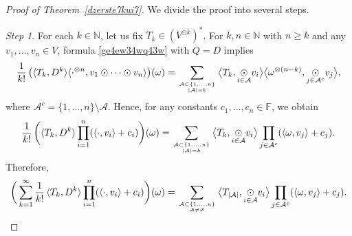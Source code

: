 \documentclass[12pt]{article}
\theoremstyle{remark}
\theoremstyle{remark}
\theoremstyle{remark}
\begin{document}
\begin{proof}[Proof of Theorem~\ref{dzerste7kui7}] We divide the proof into several 
steps.

{\it Step 1}. For each $k\in\mathbb N$, let us fix  $T_k\in(V^{\odot k})^*$. For $k,n\in\mathbb N$ with $n\ge k$ and any $v_1,\dots,v_n\in V$, formula \eqref{ge4ew34wq43w} with $Q=D$ implies
$$ \frac1{k!}\,\big(\langle T_k ,D^{k}\rangle\langle\cdot ^{\otimes n},v_1\odot\dots\odot v_n\rangle\big)(\omega)=\sum_{{\mathcal A\subset\{1,\dots,n\}}\atop{|\mathcal A|=k}}\big\langle T_k ,\underset{i\in \mathcal A}\odot v_i\big\rangle\big\langle\omega^{\otimes(n-k)},\underset{j\in \mathcal A^c}\odot v_j\big\rangle,$$
where $\mathcal A^c=\{1,\dots,n\}\setminus\mathcal A$. Hence, for any constants $c_1,\dots,c_n\in\mathbb F$, we obtain
$$ \frac1{k!}\,\bigg(\langle T_k, D^{k}\rangle\prod_{i=1}^n(\langle\cdot,v_i\rangle+c_i)\bigg)(\omega)=\sum_{{\mathcal A\subset\{1,\dots,n\}}\atop{|\mathcal A|=k}}\big\langle T_k, \underset{i\in \mathcal A}\odot v_i\big\rangle\prod_{j\in\mathcal A^c}(\langle\omega,v_j\rangle+c_j).$$
Therefore,
\begin{equation}\label{dxters5ewu}
\bigg(\sum_{k=1}^\infty \frac 1{k!}\,\langle T_k, D^{k}\rangle\prod_{i=1}^n(\langle\cdot,v_i\rangle+c_i)\bigg)(\omega) =\sum_{{\mathcal A\subset\{1,\dots,n\}}\atop{\mathcal A\ne\varnothing}}\big\langle T_{|\mathcal A|}, \underset{i\in \mathcal A}\odot v_i\big\rangle\prod_{j\in\mathcal A^c}(\langle\omega,v_j\rangle+c_j).\end{equation}


\end{proof}
\end{document}
